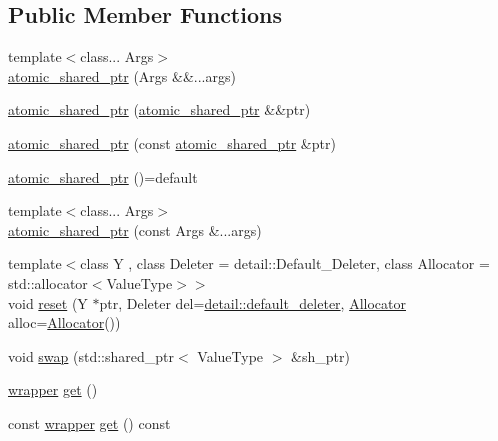 \subsection*{Public Member Functions}
\begin{DoxyCompactItemize}
\item 
{\footnotesize template$<$class... Args$>$ }\\\hyperlink{classBC_1_1memory_1_1atomic__shared__ptr_a5e60d8cd3873420741fe6b2c12cacb86}{atomic\+\_\+shared\+\_\+ptr} (Args \&\&...args)
\item 
\hyperlink{classBC_1_1memory_1_1atomic__shared__ptr_a3a720872a09351834feda9126f25eecb}{atomic\+\_\+shared\+\_\+ptr} (\hyperlink{classBC_1_1memory_1_1atomic__shared__ptr}{atomic\+\_\+shared\+\_\+ptr} \&\&ptr)
\item 
\hyperlink{classBC_1_1memory_1_1atomic__shared__ptr_a46f2567c2a73e455595835d7633cfe3a}{atomic\+\_\+shared\+\_\+ptr} (const \hyperlink{classBC_1_1memory_1_1atomic__shared__ptr}{atomic\+\_\+shared\+\_\+ptr} \&ptr)
\item 
\hyperlink{classBC_1_1memory_1_1atomic__shared__ptr_aec6b34765f04d120c96236c21a15c981}{atomic\+\_\+shared\+\_\+ptr} ()=default
\item 
{\footnotesize template$<$class... Args$>$ }\\\hyperlink{classBC_1_1memory_1_1atomic__shared__ptr_a3728bb6491f877538ac4868ec43f5360}{atomic\+\_\+shared\+\_\+ptr} (const Args \&...args)
\item 
{\footnotesize template$<$class Y , class Deleter  = detail\+::\+Default\+\_\+\+Deleter, class Allocator  = std\+::allocator$<$\+Value\+Type$>$$>$ }\\void \hyperlink{classBC_1_1memory_1_1atomic__shared__ptr_a59b1b6c8781a2b70008e1ae4c8325d17}{reset} (Y $\ast$ptr, Deleter del=\hyperlink{namespaceBC_1_1memory_1_1detail_a42827b91c57157365e4c7249397f12b6}{detail\+::default\+\_\+deleter}, \hyperlink{namespaceBC_a934f94b17b06290e6b241e5f59930c5f}{Allocator} alloc=\hyperlink{namespaceBC_a934f94b17b06290e6b241e5f59930c5f}{Allocator}())
\item 
void \hyperlink{classBC_1_1memory_1_1atomic__shared__ptr_ad7a862c5433c6c3c5af8b55762d4fe0f}{swap} (std\+::shared\+\_\+ptr$<$ Value\+Type $>$ \&sh\+\_\+ptr)
\item 
\hyperlink{structBC_1_1memory_1_1atomic__shared__ptr_1_1wrapper}{wrapper} \hyperlink{classBC_1_1memory_1_1atomic__shared__ptr_afc9fbab0c0f7744b1364c03675b6fa13}{get} ()
\item 
const \hyperlink{structBC_1_1memory_1_1atomic__shared__ptr_1_1wrapper}{wrapper} \hyperlink{classBC_1_1memory_1_1atomic__shared__ptr_ac25a830aee63f9273529cb0a67350166}{get} () const 

\end{DoxyCompactItemize}
